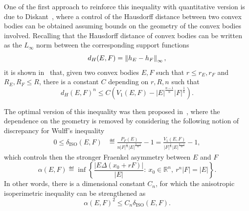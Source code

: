 \documentclass[a4paper, 10pt, twoside]{amsart}
\numberwithin{equation}{section}
\theoremstyle{plain}
\theoremstyle{definition}
\begin{document}
One of the first approach to reinforce this inequality with quantitative version is due to Diskant~\cite{diskant1972bounds}, where a control of the Hausdorff distance between two convex bodies can be obtained assuming bounds on the geometry of the convex bodies involved. Recalling that the Hausdorff distance of convex bodies can be written as the $L_\infty$ norm between the corresponding support functions 
\[
    d_H(E,F) = \left\lVert h_E - h_F\right\rVert_{\infty}, 
\]
it is shown in~\cite{diskant1972bounds} that, given two convex bodies $E,F$ such that $r \le r_E, r_F$ and $R_E, R_F \le R$, there is a constant $C$ depending on $r,R,n$ such that 
\begin{equation}\label{eq.diskant_isoperimetric}
    {d_H(E,F)}^n \le C \left(V_1(E,F) - |E|^{\frac{n-1}{n}}|F|^{\frac{1}{n}} \right).
\end{equation}

The optimal version of this inequality was then proposed in~\cite{figalli2010stability}, where the dependence on the geometry is removed by considering the following notion of discrepancy for Wulff's inequality 
\begin{align}\label{eq.deficit_ISO}
    0\le \delta_{\text{ISO}}(E,F) 
    &\eqdef 
    \frac{P_F(E)}{n|F|^{\frac{1}{n}}|E|^{\frac{n-1}{n}}} - 1 %
    = 
    \frac{V_1(E,F)}{|F|^{\frac{1}{n}}|E|^{\frac{n-1}{n}}} - 1,
\end{align}
which controls then the stronger Fraenkel asymmetry between $E$ and $F$
\begin{equation}\label{eq.quantitative_isoperimetric}
    \alpha(E,F) 
    \eqdef 
    \inf\left\{
        \frac{|E \Delta (x_0 + rF)|}{|E|} : \
        x_0 \in \mathbb{R}^n, \ r^n|F| = |E|    
    \right\}. 
\end{equation}
In other words, there is a dimensional constant $C_n$, for which the anisotropic isoperimetric inequality can be strengthened as 
\begin{equation}
    {\alpha(E,F)}^2
    \le 
    C_n\delta_{\text{ISO}}(E,F). 
\end{equation}
\end{document}
